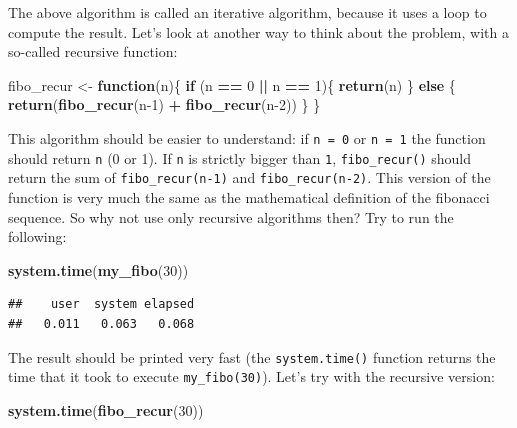 \documentclass[]{gitbook}
\newenvironment{Shaded}{\begin{snugshade}}{\end{snugshade}}
\newcommand{\ControlFlowTok}[1]{\textcolor[rgb]{0.13,0.29,0.53}{\textbf{#1}}}
\newcommand{\DecValTok}[1]{\textcolor[rgb]{0.00,0.00,0.81}{#1}}
\newcommand{\KeywordTok}[1]{\textcolor[rgb]{0.13,0.29,0.53}{\textbf{#1}}}
\newcommand{\NormalTok}[1]{#1}
\newcommand{\OperatorTok}[1]{\textcolor[rgb]{0.81,0.36,0.00}{\textbf{#1}}}
\newcommand{\StringTok}[1]{\textcolor[rgb]{0.31,0.60,0.02}{#1}}
\theoremstyle{definition}
\theoremstyle{definition}
\theoremstyle{definition}
\theoremstyle{remark}
\begin{document}
The above algorithm is called an iterative algorithm, because it uses a
loop to compute the result. Let's look at another way to think about the
problem, with a so-called recursive function:

\begin{Shaded}
\begin{Highlighting}[]
\NormalTok{fibo_recur <-}\StringTok{ }\ControlFlowTok{function}\NormalTok{(n)\{}
 \ControlFlowTok{if}\NormalTok{ (n }\OperatorTok{==}\StringTok{ }\DecValTok{0} \OperatorTok{||}\StringTok{ }\NormalTok{n }\OperatorTok{==}\StringTok{ }\DecValTok{1}\NormalTok{)\{}
   \KeywordTok{return}\NormalTok{(n)}
\NormalTok{   \} }\ControlFlowTok{else}\NormalTok{ \{}
     \KeywordTok{return}\NormalTok{(}\KeywordTok{fibo_recur}\NormalTok{(n}\DecValTok{-1}\NormalTok{) }\OperatorTok{+}\StringTok{ }\KeywordTok{fibo_recur}\NormalTok{(n}\DecValTok{-2}\NormalTok{))}
\NormalTok{   \}}
\NormalTok{\}}
\end{Highlighting}
\end{Shaded}

This algorithm should be easier to understand: if \texttt{n\ =\ 0} or
\texttt{n\ =\ 1} the function should return \texttt{n} (0 or 1). If
\texttt{n} is strictly bigger than \texttt{1}, \texttt{fibo\_recur()}
should return the sum of \texttt{fibo\_recur(n-1)} and
\texttt{fibo\_recur(n-2)}. This version of the function is very much the
same as the mathematical definition of the fibonacci sequence. So why
not use only recursive algorithms then? Try to run the following:

\begin{Shaded}
\begin{Highlighting}[]
\KeywordTok{system.time}\NormalTok{(}\KeywordTok{my_fibo}\NormalTok{(}\DecValTok{30}\NormalTok{))}
\end{Highlighting}
\end{Shaded}

\begin{verbatim}
##    user  system elapsed 
##   0.011   0.063   0.068
\end{verbatim}

The result should be printed very fast (the \texttt{system.time()}
function returns the time that it took to execute
\texttt{my\_fibo(30)}). Let's try with the recursive version:

\begin{Shaded}
\begin{Highlighting}[]
\KeywordTok{system.time}\NormalTok{(}\KeywordTok{fibo_recur}\NormalTok{(}\DecValTok{30}\NormalTok{))}
\end{Highlighting}
\end{Shaded}
\end{document}
